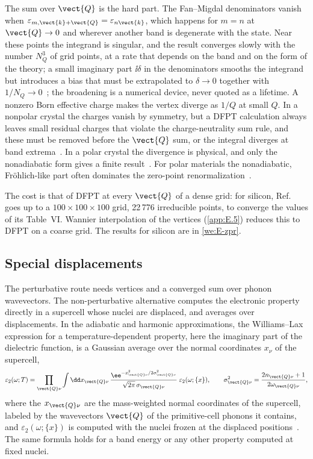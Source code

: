 The sum over $\vect{Q}$ is the hard part. The Fan--Migdal denominators vanish when $\varepsilon_{m,\vect{k}+\vect{Q}} = \varepsilon_{n\vect{k}}$, which happens for $m = n$ at $\vect{Q} \to 0$ and wherever another band is degenerate with the state. Near these points the integrand is singular, and the result converges slowly with the number $N_Q^3$ of grid points, at a rate that depends on the band and on the form of the theory; a small imaginary part $\ii\delta$ in the denominators smooths the integrand but introduces a bias that must be extrapolated to $\delta \to 0$ together with $1/N_Q \to 0$~\cite[Sect.~III and Table~II]{ponce2015temperature}; the broadening is a numerical device, never quoted as a lifetime. A nonzero Born effective charge makes the vertex diverge as $1/Q$ at small $Q$. In a nonpolar crystal the charges vanish by symmetry, but a DFPT calculation always leaves small residual charges that violate the charge-neutrality sum rule, and these must be removed before the $\vect{Q}$ sum, or the integral diverges at band extrema~\cite[Sect.~III]{ponce2015temperature}. In a polar crystal the divergence is physical, and only the nonadiabatic form gives a finite result~\cite{ponce2015temperature}. For polar materials the nonadiabatic, Fröhlich-like part often dominates the zero-point renormalization~\cite{miglio2020predominance}.

The cost is that of DFPT at every $\vect{Q}$ of a dense grid: for silicon, Ref.~\cite{ponce2015temperature} goes up to a $100\times100\times100$ grid, 22\,776 irreducible points, to converge the values of its Table~VI. Wannier interpolation of the vertices (\cref{app:E.5}) reduces this to DFPT on a coarse grid. The results for silicon are in \cref{we:E-zpr}.

\subsection{Special displacements}

The perturbative route needs vertices and a converged sum over phonon wavevectors. The non-perturbative alternative computes the electronic property directly in a supercell whose nuclei are displaced, and averages over displacements. In the adiabatic and harmonic approximations, the Williams--Lax expression for a temperature-dependent property, here the imaginary part of the dielectric function, is a Gaussian average over the normal coordinates $x_\nu$ of the supercell,
\begin{equation}
  \varepsilon_2(\omega;T) = \prod_{\vect{Q}\nu}\int\dd x_{\vect{Q}\nu}\,\frac{\ee^{-x_{\vect{Q}\nu}^2/2\sigma_{\vect{Q}\nu}^2}}{\sqrt{2\pi}\,\sigma_{\vect{Q}\nu}}\;\varepsilon_2(\omega;\{x\}), \qquad \sigma_{\vect{Q}\nu}^2 = \frac{2n_{\vect{Q}\nu} + 1}{2\omega_{\vect{Q}\nu}} ,
  \label{eq:E.8-wl}
\end{equation}
where the $x_{\vect{Q}\nu}$ are the mass-weighted normal coordinates of the supercell, labeled by the wavevectors $\vect{Q}$ of the primitive-cell phonons it contains, and $\varepsilon_2(\omega;\{x\})$ is computed with the nuclei frozen at the displaced positions~\cite[Eqs.~(3) and~(4), with mass-weighted coordinates]{zacharias2016one}. The same formula holds for a band energy or any other property computed at fixed nuclei.

